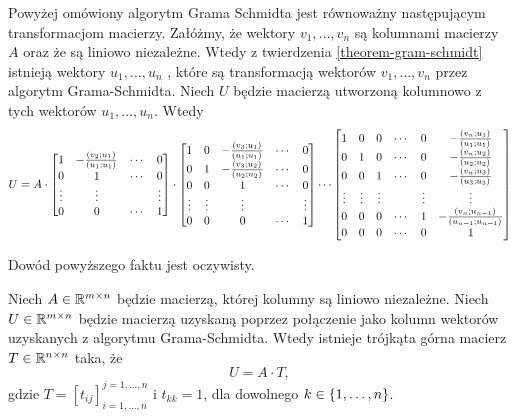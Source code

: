\documentclass[12pt,a4paper]{report}
\newcommand{\mx}[1]{{#1}}
\newcommand{\proj}[2]{\frac{\scalar{#2}{#1}}{\scalar{#1}{#1}}}
\begin{document}
\begin{lemma} \label{lemma-matrix-formulation-of-gs}
Powyżej omówiony algorytm Grama Schmidta jest równoważny następującym transformacjom macierzy. Załóżmy, że wektory $v_{1}, \ldots, v_n$ są kolumnami macierzy $\mx{A}$ oraz że są liniowo niezależne. Wtedy z twierdzenia \ref{theorem-gram-schmidt} istnieją wektory $u_1, \ldots, u_n$ , które są transformacją wektorów $v_1, \ldots, v_n$ przez algorytm Grama-Schmidta. Niech $\mx{U}$ będzie macierzą utworzoną kolumnowo z tych wektorów $u_1, \ldots, u_n$. Wtedy
{\small
$$
U = A \cdot 
\begin{bmatrix}
1 & -\proj{u_1}{v_2} & \cdots & 0 \\
0 & 1 & \cdots & 0 \\
\vdots & \vdots & & \vdots \\
0 & 0 & \cdots & 1
\end{bmatrix} \cdot
\begin{bmatrix}
1 & 0 & -\proj{u_1}{v_3} &\cdots & 0 \\
0 & 1 & -\proj{u_2}{v_3} &\cdots & 0 \\
0 & 0 & 1 & \cdots & 0 \\
\vdots & \vdots & \vdots &  & \vdots \\
0 & 0 & 0 & \cdots & 1
\end{bmatrix}
 \cdots
\begin{bmatrix}
1 & 0 & 0 & \cdots & 0 & -\proj{u_1}{v_n} \\
0 & 1 & 0 & \cdots & 0 &-\proj{u_2}{v_n} \\
0 & 0 & 1 & \cdots & 0 & -\proj{u_3}{v_n} \\
\vdots & \vdots & \vdots &  & \vdots & \vdots \\
0 & 0 & 0 & \cdots & 1 & -\proj{u_{n-1}}{v_n} \\
0 & 0 & 0 & \cdots & 0 & 1
\end{bmatrix}
$$ 
}
\end{lemma}

Dowód powyższego faktu jest oczywisty. 



\begin{lemma}\label{lemma-gram-schmidt-matrix}
Niech $\mx{A} \in \setR^{m \times n}$ będzie macierzą, której kolumny są liniowo niezależne. Niech $\mx{U} \in \setR^{m \times n}$ będzie macierzą uzyskaną poprzez połączenie jako kolumn wektorów uzyskanych z algorytmu Grama-Schmidta. Wtedy istnieje trójkąta górna macierz $\mx{T} \in \setR^{n \times n}$ taka, że
$$
\mx{U} = \mx{A} \cdot \mx{T},
$$
gdzie $\mx{T} = [t_{ij}]_{i = 1, \ldots , n}^{j = 1, \ldots, n}$ i $t_{kk} = 1$, dla dowolnego $k \in \left\lbrace {1,\ldots,n} \right\rbrace$.
\end{lemma}
\end{document}
